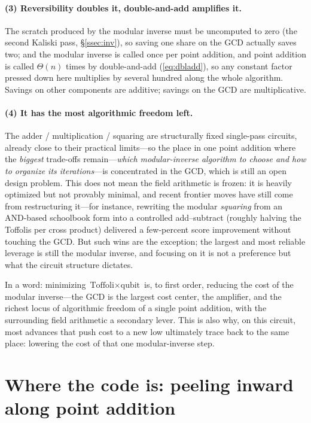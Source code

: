\documentclass[11pt]{article}
\newcommand{\secref}[1]{\hyperref[#1]{\S\ref*{#1}}}
\begin{document}
\paragraph{(3) Reversibility doubles it, double-and-add amplifies it.}
The scratch produced by the modular inverse must be uncomputed to zero (the second Kaliski pass, \secref{ssec:inv}), so saving one share on the GCD actually saves two;
and the modular inverse is called once per point addition, and point addition is called $\Theta(n)$ times by double-and-add (\eqref{eq:dbladd}), so any constant
factor pressed down here multiplies by several hundred along the whole algorithm. Savings on other components are additive; savings on the GCD are multiplicative.

\paragraph{(4) It has the most algorithmic freedom left.}
The adder / multiplication / squaring are structurally fixed single-pass circuits, already close to their practical limits---so the place in one point addition where the \emph{biggest} trade-offs remain---\emph{which modular-inverse
algorithm to choose and how to organize its iterations}---is concentrated in the GCD, which is still an open design problem. This does not mean the field arithmetic is frozen: it is heavily optimized but not provably minimal, and recent frontier moves have still come from restructuring it---for instance, rewriting the modular \emph{squaring} from an AND-based schoolbook form into a controlled add--subtract (roughly halving the Toffolis per cross product) delivered a few-percent score improvement without touching the GCD. But such wins are the exception; the largest and most reliable leverage is still the modular inverse, and focusing on it is not a preference but what the circuit structure dictates.

\medskip
In a word: minimizing $\text{Toffoli}\times\text{qubit}$ is, to first order, reducing the cost of the modular inverse---the GCD is the largest cost
center, the amplifier, and the richest locus of algorithmic freedom of a single point addition, with the surrounding field arithmetic a secondary lever. This is also why, on this circuit, most advances that push cost to a new low ultimately trace back to the same place:
lowering the cost of that one modular-inverse step.

\section{Where the code is: peeling inward along point addition}
\end{document}
